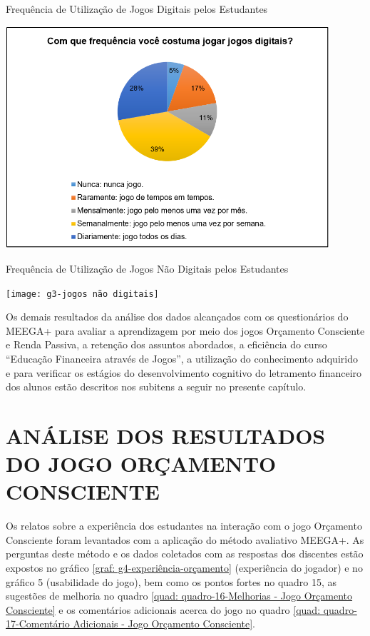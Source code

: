 \graphicspath{{graficos/}} 
\begin{grafico}[!ht]
\centering
\begin{minipage}{0.9\textwidth}
\caption{Frequência de Utilização de Jogos Digitais pelos Estudantes}
\centering
\includegraphics[width=0.9\textwidth]{g2-jogos digitais}
\label{graf: g2-jogos digitais}
\end{minipage}
\end{grafico}

\graphicspath{{graficos/}} 
\begin{grafico}[!ht]
\centering
\begin{minipage}{0.9\textwidth}
\caption{Frequência de Utilização de Jogos Não Digitais pelos Estudantes}
\centering
\texttt{[image: g3-jogos não digitais]}
\label{graf: g3-jogos não digitais}
\end{minipage}
\end{grafico}

\newpage
Os demais resultados da análise dos dados alcançados com os questionários do MEEGA+ para avaliar a aprendizagem por meio dos jogos Orçamento Consciente e Renda Passiva, a retenção dos assuntos abordados, a eficiência do curso “Educação Financeira através de Jogos”, a utilização do conhecimento adquirido e para verificar os estágios do desenvolvimento cognitivo do letramento financeiro dos alunos estão descritos nos subitens a seguir no presente capítulo.

\section{ANÁLISE DOS RESULTADOS DO JOGO ORÇAMENTO CONSCIENTE}
Os relatos sobre a experiência dos estudantes na interação com o jogo Orçamento Consciente foram levantados com a aplicação do método avaliativo MEEGA+. As perguntas deste método e os dados coletados com as respostas dos discentes estão expostos no gráfico \ref{graf: g4-experiência-orçamento} (experiência do jogador) e no gráfico 5 (usabilidade do jogo), bem como os pontos fortes no quadro 15, as sugestões de melhoria no quadro \ref{quad: quadro-16-Melhorias - Jogo Orçamento Consciente} e os comentários adicionais acerca do jogo no quadro \ref{quad: quadro-17-Comentário Adicionais - Jogo Orçamento Consciente}.

